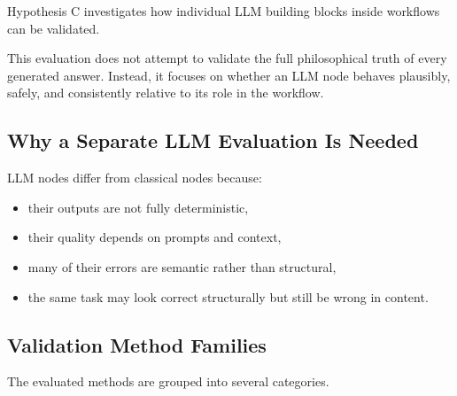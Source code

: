 \documentclass[12pt,a4paper]{article}
\begin{document}
Hypothesis C investigates how individual LLM building blocks inside workflows can be validated.

This evaluation does not attempt to validate the full philosophical truth of every generated answer. Instead, it focuses on whether an LLM node behaves plausibly, safely, and consistently relative to its role in the workflow.

\subsection{Why a Separate LLM Evaluation Is Needed}

LLM nodes differ from classical nodes because:

\begin{itemize}
  \item their outputs are not fully deterministic,
  \item their quality depends on prompts and context,
  \item many of their errors are semantic rather than structural,
  \item the same task may look correct structurally but still be wrong in content.
\end{itemize}

\subsection{Validation Method Families}

The evaluated methods are grouped into several categories.
\end{document}
